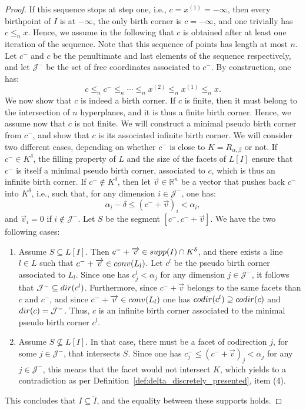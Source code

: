 \documentclass{article}
\newcommand{\conv}[1]{ {\rm conv}(#1) }
\newcommand{\dir}[1]{ {\rm dir}(#1) }
\newcommand{\codir}[1]{ {\rm codir}(#1) }
\newcommand{\leqn}{\leq_n}
\newcommand{\lowerb}[1]{ L[#1] }
\newcommand{\supp}[1]{ {\rm supp}(#1) }
\newcommand{\rectangle}[2]{ R_{#1, #2} }
\DeclareRobustCommand*{\ora}{\overrightarrow}
\begin{document}
\begin{proof}
		If this sequence stops at step one, i.e., $c=x^{(1)}=-\boldsymbol \infty$,
		then every birthpoint of $I$ is at $-\boldsymbol\infty$, the only birth corner is $c=-\boldsymbol\infty$, and one trivially has
		$c\leqn x$. %
		Hence,
		we assume in the following that $c$ is obtained after at least one iteration of the sequence.
		Note that this sequence of points has length at most $n$.
		Let $c^-$ and $c$ be the penultimate and last elements of the sequence respectively,
		and let $\mathcal J^-$ be the set of free coordinates associated to $c^-$. %
		By construction, one has:
		\begin{equation*}
			c \leqn c^- \leqn \cdots\leqn x^{(2)}\leqn x^{(1)} \leqn x.
		\end{equation*}
		We now show that $c$ is indeed a birth corner.
		If $c$ is finite,
		then it must belong to the intersection of $n$ hyperplanes, %
		and it is thus a finite birth corner.
		Hence, we assume now that $c$ is not finite. We will construct a minimal pseudo birth corner from $c^-$,
		and show that $c$ is its associated infinite birth corner. %
		We will consider two different cases, depending on whether $c^-$ is close to $K=\rectangle{\alpha}{\beta}$ or not.
		If $c^- \in K^\delta$, the filling property of $L$ and the size of the facets of $\lowerb{I}$ ensure that $c^-$ is itself %
		a minimal pseudo birth corner, associated to $c$, which is thus an infinite birth corner. %
		If $c^- \notin K^{\delta}$, then let $ \overrightarrow v \in \mathbb R^n$ be a vector that pushes back $c^-$ into $K^\delta$, i.e.,
		such that, for any dimension $i\in \mathcal J^- $, one has: %
		$$\alpha_i - \delta \leq (c^-+\overrightarrow v)_i < \alpha_i,
		$$
		and $ \ora v_i = 0$ if $i \notin \mathcal J^-$.
		Let $S$ be the segment $[c^-, c^- + \ora v]$.
		We have the two following cases:
		\begin{enumerate}
			\item Assume $S \subseteq \lowerb{I}$. Then $c^- + \ora v \in \supp{I} \cap K^\delta$, and there exists a line $l \in L$
				such that $c^-+\ora v \in \conv{L_l}$. Let $c^l$ be the pseudo birth corner associated to $L_l$. %
				Since one has $c^l_j < \alpha_j$ for any dimension $j \in \mathcal J^-$, %
				it follows that $\mathcal J^- \subseteq \dir{c^l}$. %
				Furthermore, since $c^-+\ora v$ %
				belongs to the same facets than $c$ and $c^-$, and since  $c^-+\ora v \in \conv{L_l}$
				one has $ \codir{c^l} \supseteq \codir{c}$ and $\dir{c} = \mathcal J^- $. %
				Thus, $c$ is an infinite birth
				corner associated to the minimal pseudo birth corner $c^l$.

			\item Assume $S \not\subseteq \lowerb{I}$. In that case, there must be a facet of codirection $j$, for some $j \in \mathcal J^-$, that intersects $S$.
				Since
				one has $c^-_j \leq (c^-+\ora v)_j  < \alpha_j$ for any $j \in \mathcal J^-$, this means that the facet would not intersect $K$,
				which yields to a contradiction as per Definition~\ref{def:delta_discretely_presented}, item (4).
		\end{enumerate}
		This concludes that $ {I} \subseteq {\tilde I}$, and the equality between these supports holds. %
	\end{proof}
\end{document}
